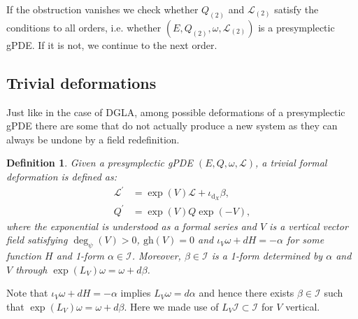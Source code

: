 \documentclass[a4paper,12pt]{article}
\numberwithin{equation}{section} %
\newtheorem{definition}[thm]{Definition}
\newcommand{\gh}[1]{\mathrm{gh}(#1)}
\newcommand{\dx}{\mathrm{d}_X}
\def\cI{\mathcal{I}}
\def\cL{\mathcal{L}}
\newcommand{\jordi}[1]{\textcolor{violet}{#1}}
\newcommand{\h}{\cL}
\begin{document}
If the obstruction vanishes we check whether $Q_{(2)}$ and $\h_{(2)}$ satisfy the conditions to all orders, i.e. whether $(E,Q_{(2)},\omega, \cL_{(2)})$ is a presymplectic gPDE. If it is not, we continue to the next order.

\subsection{Trivial deformations}
\label{sec_triv_def}



Just like in the case of DGLA, among possible deformations of a presymplectic gPDE there are some that do not actually produce a new system as they can always be undone by a field redefinition. 

\begin{definition}
	Given a presymplectic gPDE $(E,Q,\omega,\h)$, a \textit{trivial formal deformation}
	is defined as: 
	\begin{align}
		 \cL^\prime &= \exp(V)\cL+\iota_{\dx}\beta,\quad  \label{eq_def_trivb_1} \\
	 Q^\prime &= \exp(V) Q \exp(-V), \label{eq_def_trivb_2}
	\end{align}	
    where the exponential is understood as a formal series and $V$ is a vertical vector field satisfying $\deg_\psi(V) > 0$, $\gh{V} = 0$ and  $\iota_V\omega +d H=-\alpha$ for some function $H$ and 1-form $\alpha \in \cI$. Moreover, $\beta \in \cI$ is a 1-form determined by $\alpha$ and $V$ through $\exp(L_V)\omega=\omega+d\beta$.
\end{definition}
Note that $\iota_V\omega +d H=-\alpha$ implies $L_V\omega=d\alpha$ and hence there exists $\beta \in \cI$ such that $\exp(L_V)\omega=\omega+d\beta$. Here we made use of $L_V\cI\subset \cI$ for $V$ vertical. %
\end{document}
